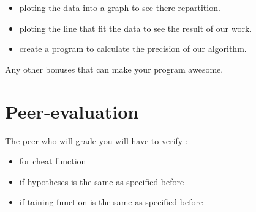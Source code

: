\documentclass{42}
\begin{document}
	\begin{itemize}\itemsep1pt
		\item ploting the data into a graph to see there repartition.
		\item ploting the line that fit the data to see the result of our work.
		\item create a program to calculate the precision of our algorithm.
	\end{itemize}
	\vspace{10mm}
	Any other bonuses that can make your program awesome.


\chapter{Peer-evaluation}

	The peer who will grade you will have to verify :\\
	\begin{itemize}\itemsep1pt
		\item for cheat function
		\item if hypotheses is the same as specified before
		\item if taining function is the same as specified before
	\end{itemize}
\end{document}
